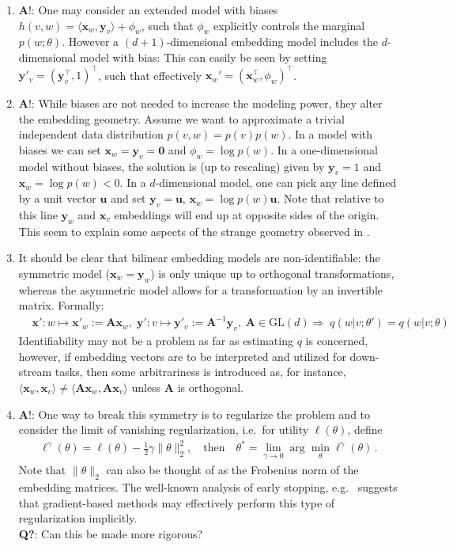 \documentclass{article}
\newcommand{\x}{{\mathbf x}}
\newcommand{\y}{{\mathbf y}}
\newcommand{\textbred}[1]{{\color{Red} \textbf #1}}
\begin{document}
\begin{enumerate}
\item \textbred{A!:} One may consider an extended model with biases $h(v,w) = \langle \x_w, \y_v \rangle + \phi_w$, such that $\phi_w$ explicitly controls the marginal $p(w;\theta)$. However a $(d+1)$-dimensional embedding model includes the $d$-dimensional model with bias: This can easily be seen by setting $\y'_{v} = (\y_v^\top, 1)^\top\!$, such that effectively $\x_w'=(\x_w^\top, \phi_w)^\top$. 
\item \textbred{A!:} While biases are not needed to increase the modeling power, they alter the embedding geometry. Assume we want to approximate a trivial independent data distribution $p(v,w)=p(v)p(w)$. In a model with biases we can set $\x_w=\y_v=\mathbf 0$ and $\phi_w = \log p(w)$. In a one-dimensional model without biases, the solution  is (up to rescaling) given by $\y_v=1$ and $\x_w = \log p(w)<0$. In a $d$-dimensional model, one can pick any line defined by a unit vector $\mathbf u$ and set $\y_v = \mathbf u$, $\x_w =  \log p(w) \mathbf u$. Note that relative to this line $\y_w$ and $\x_v$ embeddings will end up at opposite sides of the origin. This seem to explain some aspects of the strange geometry observed in \cite{mimno2017strange}.
\item It should be clear that bilinear embedding models are non-identifiable: the symmetric model ($\x_w=\y_w$) is only unique up to orthogonal transformations, whereas the asymmetric model allows for a transformation by an invertible matrix. Formally: 
\begin{align*}
& \x': w \mapsto \x'_w := \mathbf A \x_w, \; \y': v \mapsto \y'_v := \mathbf A^{-1} \y_v, \;  \mathbf A \in \text{GL}(d)  
 \Longrightarrow \; q(w| v;\theta') = q(w|v;\theta)
	\nonumber
\end{align*} 
Identifiability may not be a problem as far as estimating $q$ is concerned, however, if embedding vectors are to be interpreted and utilized for down-stream tasks, then some arbitrariness is introduced as, for instance, $\langle \x_w, \x_v \rangle \neq \langle \mathbf A \x_w, \mathbf A \x_{v} \rangle$ unless $\mathbf A$ is orthogonal. 
\item \textbred{A!}: One way to break this symmetry is to regularize the problem and to consider the limit of vanishing regularization, i.e.~for utility $\ell(\theta)$, define
\begin{align}
\ell^\gamma(\theta) = \ell(\theta) - \tfrac 12 \gamma \| \theta\|_2^2,\quad \text{then} \quad \theta^* = \lim_{\gamma \to 0} \arg\min_\theta \ell^\gamma(\theta) \,.
\end{align}
Note that $\| \theta\|_2$ can also be thought of as the Frobenius norm of the embedding matrices. The well-known analysis of early stopping, e.g.~\cite[Section 7.8]{goodfellow2016deep} suggests that gradient-based methods may effectively perform this type of regularization implicitly.\\[2mm]
\textbf{Q?}: Can this be made more rigorous? 
\end{enumerate}
\end{document}

